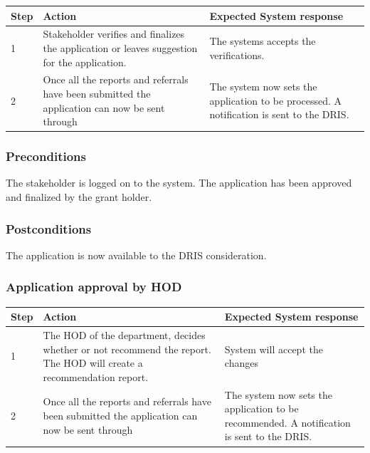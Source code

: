\documentclass[12pt]{article}
\begin{document}
\begin{center}
\begin{tabular}{|l|p{6cm}|p{8cm}|}
\hline
Step & Action & Expected System response \\
\hline
1 & Stakeholder verifies and finalizes the application or leaves suggestion for the application. & The systems accepts the verifications. \\
\hline
2 & Once all the reports and referrals have been submitted the application can now be sent through  & The system now sets the application to be processed. A notification is sent to the DRIS. \\
\hline
\end{tabular}
\end{center}

\subsubsection*{Preconditions}
The stakeholder is logged on to the system. The application has been approved and finalized by the grant holder.

\subsubsection*{Postconditions}
The application is now available to the DRIS consideration.

\subsubsection{Application approval by HOD}

\begin{center}
\begin{tabular}{|l|p{6cm}|p{8cm}|}
\hline
Step & Action & Expected System response \\
\hline
1 & The HOD of the department, decides whether or not recommend the report. The HOD will create a recommendation report. & System will accept the changes \\
\hline
2 & Once all the reports and referrals have been submitted the application can now be sent through  & The system now sets the application to be recommended. A notification is sent to the DRIS. \\
\hline
\end{tabular}
\end{center}
\end{document}

